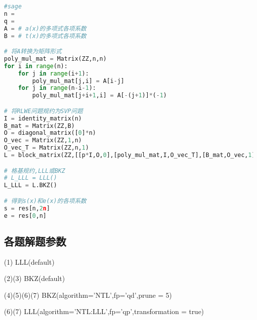 \documentclass[12pt,a4paper]{article}
\numberwithin{equation}{section}
\begin{document}
\begin{lstlisting}[language=Python]
#sage
n = 
q = 
A = # a(x)的多项式各项系数
B = # t(x)的多项式各项系数

# 将A转换为矩阵形式
poly_mul_mat = Matrix(ZZ,n,n)
for i in range(n):
    for j in range(i+1):
        poly_mul_mat[j,i] = A[i-j]
    for j in range(n-i-1):
        poly_mul_mat[j+i+1,i] = A[-(j+1)]*(-1)

# 将RLWE问题规约为SVP问题
I = identity_matrix(n)
B_mat = Matrix(ZZ,B)
O = diagonal_matrix([0]*n)
O_vec = Matrix(ZZ,1,n)
O_vec_T = Matrix(ZZ,n,1)
L = block_matrix(ZZ,[[p*I,O,0],[poly_mul_mat,I,O_vec_T],[B_mat,O_vec,1]]) # kannan embedding

# 格基规约,LLL或BKZ
# L_LLL = LLL()
L_LLL = L.BKZ()

# 得到s(x)和e(x)的各项系数
s = res[n,2n]
e = res[0,n]
\end{lstlisting}

\subsection{各题解题参数}

(1) LLL(default)

(2)(3) BKZ(default)

(4)(5)(6)(7) BKZ(algorithm='NTL',fp='qd',prune = 5)

(6)(7) LLL(algorithm='NTL:LLL',fp='qp',transformation = true)

\vspace{1em}

{\songti\fontsize{12pt}{18pt}\selectfont
	
}
%
\end{document}

